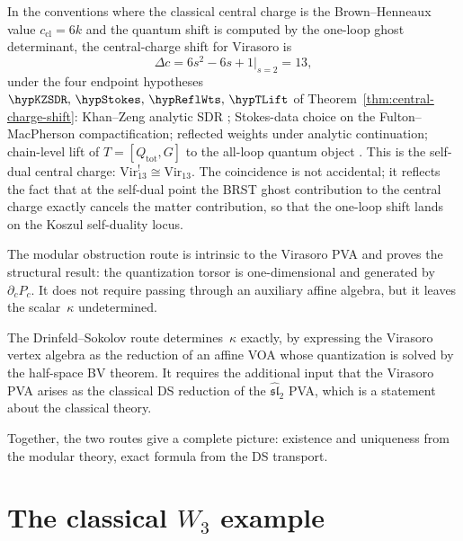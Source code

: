 \begin{remark}[The shift $\Delta c = 13$;
\ClaimStatusConditional{} on
$\hypKZSDR,\,\hypStokes,\,\hypReflWts,\,\hypTLift$]
\label{rem:virasoro-shift-13}
In the conventions where the classical central charge is the
Brown--Henneaux value $c_{\mathrm{cl}} = 6k$ and the quantum shift
is computed by the one-loop ghost determinant, the central-charge shift
for Virasoro is
\[
\Delta c = 6s^2 - 6s + 1\big|_{s=2} = 13,
\]
under the four endpoint hypotheses
$\hypKZSDR,\,\hypStokes,\,\hypReflWts,\,\hypTLift$
of Theorem~\ref{thm:central-charge-shift}: Khan--Zeng analytic SDR
\cite{KZ25}; Stokes-data choice on the Fulton--MacPherson compactification;
reflected weights under analytic continuation; chain-level lift of
$T = [Q_{\mathrm{tot}}, G]$ to the all-loop quantum object
\cite{Costello2011Renorm,CG17,LurieHA}.
This is the self-dual central charge: $\mathrm{Vir}_{13}^! \cong
\mathrm{Vir}_{13}$. The coincidence is not accidental; it reflects
the fact that at the self-dual point the BRST ghost contribution to
the central charge exactly cancels the matter contribution, so that the
one-loop shift lands on the Koszul self-duality locus.
\end{remark}

\begin{remark}
\label{rem:virasoro-two-routes}
The modular obstruction route is intrinsic to the Virasoro PVA and proves
the structural result: the quantization torsor is one-dimensional and
generated by $\partial_c P_c$. It does not require passing through an
auxiliary affine algebra, but it leaves the scalar~$\kappa$ undetermined.

The Drinfeld--Sokolov route determines~$\kappa$ exactly, by expressing
the Virasoro vertex algebra as the reduction of an affine VOA whose
quantization is solved by the half-space BV theorem. It requires the
additional input that the Virasoro PVA arises as the classical DS
reduction of the $\widehat{\mathfrak{sl}}_2$ PVA, which is a statement
about the classical theory.

Together, the two routes give a complete picture: existence and uniqueness
from the modular theory, exact formula from the DS transport.
\end{remark}

\section{The classical $W_3$ example}

